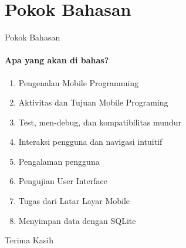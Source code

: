 \documentclass[12pt,hyperref={colorlinks,citecolor=blue,urlcolor=peking_blue,linkcolor=},aspectratio=169]{beamer}
\theoremstyle{plain}
\begin{document}
\section{Pokok Bahasan}
\begin{frame}{Pokok Bahasan}
	\framesubtitle{Apa yang akan di bahas?}
	\justifying
	\begin{multicols}{2}
		\begin{enumerate}
			\justifying
			\item Pengenalan Mobile Programming
			\item Aktivitas dan Tujuan Mobile Programing
			\item Test, men-debug, dan kompatibilitas mundur
			\item Interaksi pengguna dan navigasi intuitif
			\item Pengalaman pengguna  
			\item Pengujian User Interface
			\item Tugas dari Latar Layar Mobile
			\item Menyimpan data dengan SQLite
		\end{enumerate}
	\end{multicols}
\end{frame}

\begin{frame}
	\begin{center}
		{\fontsize{40pt}{46pt}\calligra\color{peking_dark} Terima Kasih}
	\end{center}
\end{frame}
\end{document}
